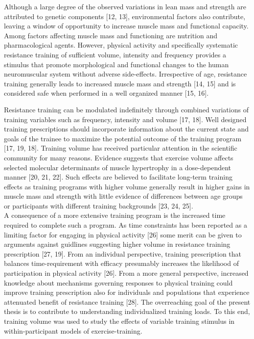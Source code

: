 \documentclass[twoside,10pt]{gihclass} %
\begin{document}
Although a large degree of the observed variations in lean mass and strength are attributed to genetic components
{[}12, 13{]},
environmental factors also contribute, leaving a window of opportunity to increase muscle mass and functional capacity. Among factors affecting muscle mass and functioning are nutrition and pharmacological agents. However, physical activity and specifically systematic resistance training of sufficient volume, intensity and frequency provides a stimulus that promote morphological and functional changes to the human neuromuscular system without adverse side-effects. Irrespective of age, resistance training generally leads to increased muscle mass and strength
{[}14, 15{]}
and is considered safe when performed in a well organized manner
{[}15, 16{]}.

Resistance training can be modulated indefinitely through combined variations of training variables such as frequency, intensity and volume
{[}17, 18{]}.
Well designed training prescriptions should incorporate information about the current state and goals of the trainee to maximize the potential outcome of the training program
{[}17, 19, 18{]}.
Training volume has received particular attention in the scientific community for many reasons. Evidence suggests that exercise volume affects selected molecular determinants of muscle hypertrophy in a dose-dependent manner
{[}20, 21, 22{]}.
Such effects are believed to facilitate long-term training effects as training programs with higher volume generally result in higher gains in muscle mass and strength with little evidence of differences between age groups or participants with different training backgrounds
{[}23, 24, 25{]}. \\
A consequence of a more extensive training program is the increased time required to complete such a program. As time constraints has been reported as a limiting factor for engaging in physical activity
{[}26{]}
some merit can be given to arguments against guidlines suggesting higher volume in resistance training prescription
{[}27, 19{]}.
From an individual perspective, training prescription that balances time-requirement with efficacy presumably increases the likelihood of participation in physical activity {[}26{]}.
From a more general perspective, increased knowledge about mechanisms governing responses to physical training could improve training prescription also for individuals and populations that experience attenuated benefit of resistance training
{[}28{]}.
The overreaching goal of the present thesis is to contribute to understanding individualized training loads. To this end, training volume was used to study the effects of variable training stimulus in within-participant models of exercise-training.
\end{document}
